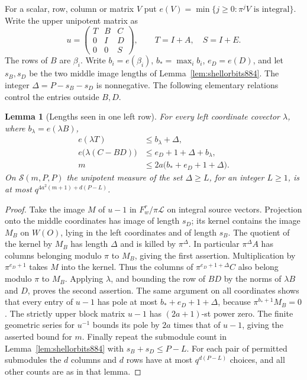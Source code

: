 \documentclass[a4paper,11pt]{article}
\newtheorem{lemma}[proposition]{Lemma}
\theoremstyle{definition}
\theoremstyle{remark}
\numberwithin{equation}{section}
\begin{document}
For a scalar, row, column or matrix \(V\) put
\(e(V)=\min\{j\ge0:\pi^j V\text{ is integral}\}\).
Write the upper unipotent matrix as
\[
 u=\begin{pmatrix}T&B&C\\0&I&D\\0&0&S\end{pmatrix},
 \qquad T=I+A,\quad S=I+E .
\]
The rows of \(B\) are \(\beta_i\). Write \(b_i=e(\beta_i)\),
\(b_*=\max_i b_i\), \(e_D=e(D)\), and let \(s_B,s_D\) be the two
middle image lengths of Lemma~\ref{lem:shellorbits884}. The integer
\(\Delta=P-s_B-s_D\) is nonnegative. The following elementary
relations control the entries outside \(B,D\).

\begin{lemma}[Lengths seen in one left row]
\leavevmode\label{lem:rowlength887}
For every left coordinate covector \(\lambda\),
where \(b_\lambda=e(\lambda B)\),
\begin{align*}
 e(\lambda T)&\le b_\lambda+\Delta,\\
 e\big(\lambda(C-BD)\big)&\le e_D+1+\Delta+b_\lambda,\\
 m&\le 2a\big(b_*+e_D+1+\Delta\big).
\end{align*}
On \(\mathcal S(m,P,P)\) the unipotent measure of the set
\(\Delta\ge L\), for an integer \(L\ge1\), is at most
\(q^{4a^2(m+1)+d(P-L)}\).
\end{lemma}
\begin{proof}
Take the image \(M\) of \(u-1\) in \(F_w^r/\pi\mathcal L\)
on integral source vectors. Projection onto the middle coordinates
has image of length \(s_D\); its kernel contains the image \(M_B\)
on \(W(O)\), lying in the left coordinates and of length \(s_B\).
The quotient of the kernel by \(M_B\) has length \(\Delta\) and
is killed by \(\pi^\Delta\). In particular \(\pi^\Delta A\)
has columns belonging modulo \(\pi\) to \(M_B\), giving the first
assertion. Multiplication by \(\pi^{e_D+1}\) takes \(M\) into the
kernel. Thus the columns of \(\pi^{e_D+1+\Delta}C\) also belong
modulo \(\pi\) to \(M_B\). Applying \(\lambda\), and bounding the
row of \(BD\) by the norms of \(\lambda B\) and \(D\), proves
the second assertion. The same argument on all coordinates
shows that every entry of \(u-1\) has pole at most
\(b_*+e_D+1+\Delta\), because \(\pi^{b_*+1}M_B=0\).
The strictly upper block matrix \(u-1\) has \((2a+1)\)-st
power zero. The finite geometric series for \(u^{-1}\) bounds
its pole by \(2a\) times that of \(u-1\), giving the asserted
bound for \(m\). Finally repeat the submodule count in
Lemma~\ref{lem:shellorbits884} with \(s_B+s_D\le P-L\).
For each pair of permitted submodules the \(d\) columns and
\(d\) rows have at most \(q^{d(P-L)}\) choices, and all other
counts are as in that lemma.
\end{proof}
\end{document}
